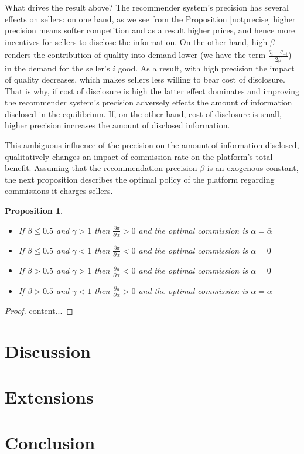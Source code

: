 \documentclass[a4paper]{article}
\newtheorem{proposition}[theorem]{Proposition}
\begin{document}
What drives the result above? The recommender system's precision has several effects on sellers: on one hand, as we see from the Proposition \ref{notprecise} higher precision means softer competition and as a result higher prices, and hence more incentives for sellers to disclose the information. On the other hand, high $\beta$ renders the contribution of quality into demand lower (we have the term $\frac{\tilde{q}_i - \tilde{q}_{-i}}{2 \beta}$) in the demand for the seller's $i$ good. As a result, with high precision the impact of quality decreases, which makes sellers less willing to bear cost of disclosure. That is why, if cost of disclosure is high the latter effect dominates and improving the recommender system's precision adversely effects the amount of information disclosed in the equilibrium. If, on the other hand, cost of disclosure is small, higher precision increases the amount of disclosed information. 



This ambiguous influence of the precision on the amount of information disclosed, qualitatively changes an impact of commission rate on the platform's total benefit. Assuming that the recommendation precision $\beta$ is an exogenous constant, the next proposition describes the optimal policy of the platform regarding commissions it charges sellers.



\begin{proposition}\label{profit_beta}
	\leavevmode 
	\begin{itemize}
		\item If $\beta \le 0.5$ and  $\gamma > 1$ then $\frac{\partial \pi }{\partial \alpha} > 0$ and the optimal commission is $\alpha = \bar{\alpha}$
		\item  If $\beta \le 0.5$ and $\gamma < 1$ then $\frac{\partial \pi }{\partial \alpha} < 0$ and the optimal commission is $\alpha = 0$	
		\item If $\beta > 0.5$ and  $\gamma > 1$ then $\frac{\partial \pi }{\partial \alpha} < 0$ and the optimal commission is $\alpha = 0$
		\item If $\beta > 0.5$ and $\gamma < 1$ then $\frac{\partial \pi }{\partial \alpha} > 0$ and the optimal commission is $\alpha = \bar{\alpha}$
	\end{itemize}
\end{proposition}
\begin{proof}
	content...
\end{proof}
	\section{Discussion}
	\section{Extensions}
	\section{Conclusion}
	\newpage
	{}
	
\end{document}
